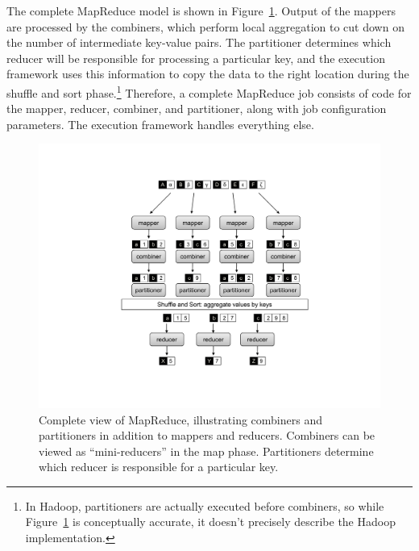 The complete MapReduce model is shown in
Figure~\ref{figure:chapter2:MapReduce-complete}.  Output of the
mappers are processed by the combiners, which perform local
aggregation to cut down on the number of intermediate key-value pairs.
The partitioner determines which reducer will be responsible for
processing a particular key, and the execution framework uses this
information to copy the data to the right location during the shuffle
and sort phase.\footnote{In Hadoop, partitioners are actually executed
before combiners, so while
Figure~\ref{figure:chapter2:MapReduce-complete} is conceptually
accurate, it doesn't precisely describe the Hadoop implementation.}
Therefore, a complete MapReduce job consists of code for the mapper,
reducer, combiner, and partitioner, along with job configuration
parameters.  The execution framework handles everything else.

\begin{figure}[t]
\begin{center}
\vspace{0.2cm}
\includegraphics[scale=0.6]{figures/fig-ch2-MapReduce-complete.pdf}
\vspace{-0.3cm}
\end{center}
\caption{Complete view of MapReduce, illustrating combiners and
  partitioners in addition to mappers and reducers.  Combiners can be
  viewed as ``mini-reducers'' in the map phase.  Partitioners
  determine which reducer is responsible for a particular key.}
\label{figure:chapter2:MapReduce-complete}
\end{figure}

